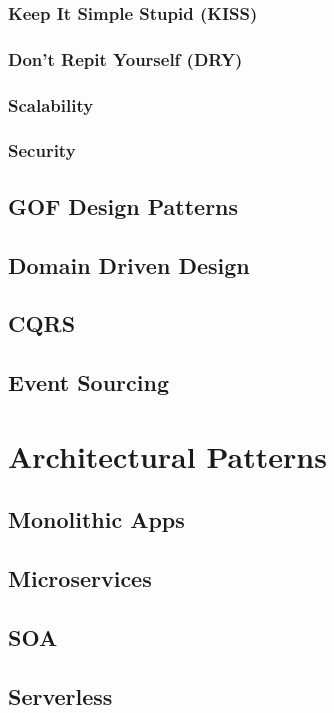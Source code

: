 \documentclass[a4paper]{article}
\begin{document}
    \subsubsection{Keep It Simple Stupid (KISS)}
    \subsubsection{Don't Repit Yourself (DRY)}
    \subsubsection{Scalability}
    \subsubsection{Security}

    \subsection{GOF Design Patterns}
    \subsection{Domain Driven Design}
    \subsection{CQRS}
    \subsection{Event Sourcing}

    \newpage
    \section{Architectural Patterns}
    \subsection{Monolithic Apps}
    \subsection{Microservices}
    \subsection{SOA}
    \subsection{Serverless}
\end{document}

